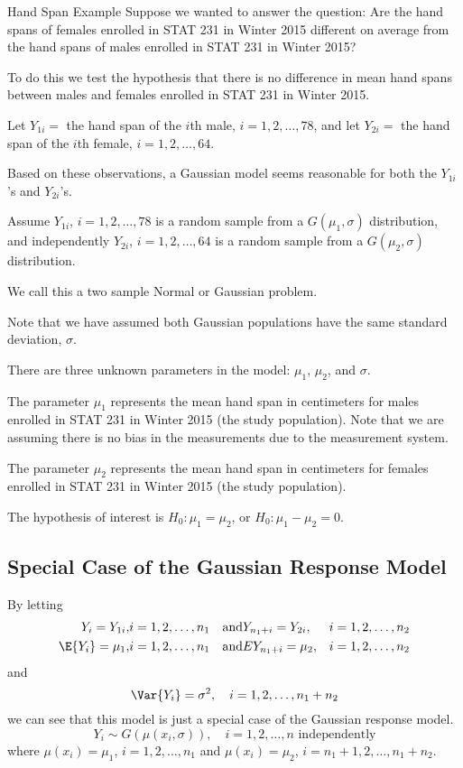 \begin{Example}{Hand Span Example}{}
    Suppose we wanted to answer the question: Are the hand spans of females enrolled
    in STAT 231 in Winter 2015 different on average from the hand spans of males enrolled
    in STAT 231 in Winter 2015?

    To do this we test the hypothesis that there is no difference in mean hand spans
    between males and females enrolled in STAT 231 in Winter 2015.

    Let $ Y_{1i}= $ the hand span of the $ i $th male, $ i=1,2,\ldots ,78 $,
    and let $ Y_{2i}= $ the hand span of the $ i $th female, $ i=1,2,\ldots ,64 $.

    Based on these observations, a Gaussian model seems reasonable for both the $ Y_{1i} $'s
    and $ Y_{2i} $'s.

    Assume $ Y_{1i} $, $ i=1,2,\ldots ,78 $ is a random sample from a $ G(\mu_1,\sigma) $
    distribution, and independently $ Y_{2i} $, $ i=1,2,\ldots ,64 $ is a random
    sample from a $ G(\mu_2,\sigma) $ distribution.

    We call this a two sample Normal or Gaussian problem.

    Note that we have assumed both Gaussian populations have the same standard deviation,
    $ \sigma $.

    There are three unknown parameters in the model: $ \mu_1 $, $ \mu_2 $, and $ \sigma $.

    The parameter $ \mu_1 $ represents the mean hand span in centimeters for males
    enrolled in STAT 231 in Winter 2015 (the study population). Note that we are assuming
    there is no bias in the measurements due to the measurement system.

    The parameter $ \mu_2 $ represents the mean hand span in centimeters for females
    enrolled in STAT 231 in Winter 2015 (the study population).

    The hypothesis of interest is $ H_0:\mu_1=\mu_2 $, or $ H_0:\mu_1-\mu_2=0 $.
\end{Example}


\subsection{Special Case of the Gaussian Response Model}
By letting
\[\begin{aligned}
        Y_{i}=Y_{1 i},     & i=1,2, \ldots, n_{1} & \text{and} & Y_{n_{1}+i}=Y_{2 i},    & i=1,2, \ldots, n_{2} \\
        \E{Y_{i}}=\mu_{1}, & i=1,2, \ldots, n_{1} & \text{and} & E{Y_{n_{1}+i}}=\mu_{2}, & i=1,2, \ldots, n_{2}
    \end{aligned}\]
and
\[\Var{Y_{i}}=\sigma^{2}, \quad i=1,2, \ldots, n_{1}+n_{2}\]
we can see that this model is just a special case of the Gaussian response model.
\[ Y_i\sim G\left( \mu(x_i,\sigma) \right),\quad i=1,2,\ldots ,n\text{ independently} \]
where $ \mu(x_i)=\mu_1 $, $ i=1,2,\ldots ,n_1 $ and $ \mu(x_i)=\mu_2 $, $ i=n_1+1,2,\ldots ,n_1+n_2 $.

